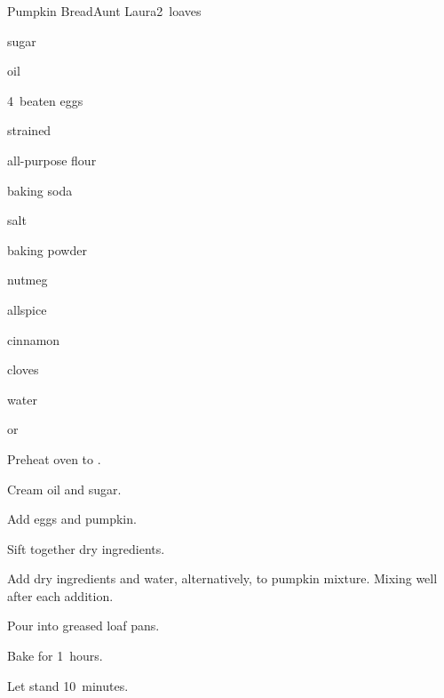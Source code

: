 \begin{recipe}{Pumpkin Bread}{Aunt Laura}{2~loaves}

\begin{ingredients}
\item {} sugar
\item {} oil
\item 4~beaten eggs
\item {} strained 
\item \C{3\half} all-purpose flour
\item {} baking soda
\item {} salt
\item {} baking powder
\item {} nutmeg
\item {} allspice
\item {} cinnamon
\item \tp{\half} cloves
\item \C{\twothird} water
\item \C{\half}  or 
\end{ingredients}

\begin{directions}
\item Preheat oven to .
\item Cream oil and sugar.
\item Add eggs and pumpkin.
\item Sift together dry ingredients.
\item Add dry ingredients and water, alternatively, to pumpkin mixture. Mixing well after each addition.
\item Pour into greased loaf pans.
\item Bake for 1\half~hours.
\item Let stand 10~minutes.
\end{directions}

\end{recipe}
